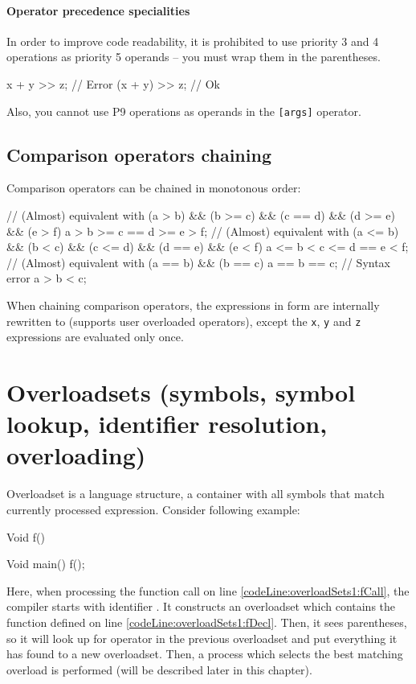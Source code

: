 \paragraph{Operator precedence specialities}
In order to improve code readability, it is prohibited to use priority 3 and 4 operations as priority 5 operands -- you must wrap them in the parentheses.
\begin{code}
x + y >> z; // Error
(x + y) >> z; // Ok
\end{code}

Also, you cannot use P9 operations as operands in the \verb|[args]| operator.

\subsection{Comparison operators chaining} Comparison operators can be chained in monotonous order:
\begin{code}
// (Almost) equivalent with (a > b) && (b >= c) && (c == d) && (d >= e) && (e > f)
a > b >= c == d >= e > f;
// (Almost) equivalent with (a <= b) && (b < c) && (c <= d) && (d == e) && (e < f)
a <= b < c <= d == e < f;
// (Almost) equivalent with (a == b) && (b == c)
a == b == c;
// Syntax error
a > b < c;
\end{code}

When chaining comparison operators, the expressions in form  are internally rewritten to  (supports user overloaded operators), except the \verb|x|, \verb|y| and \verb|z| expressions are evaluated only once.

\section{Overloadsets (symbols, symbol lookup, identifier resolution, overloading)}
Overloadset is a language structure, a container with all symbols that match currently processed expression. Consider following example:

\begin{code}
	Void f() {}$\label{codeLine:overloadSets1:fDecl}$
	
	Void main() {
		f();$\label{codeLine:overloadSets1:fCall}$	
	}
\end{code}

Here, when processing the function call on line \ref{codeLine:overloadSets1:fCall}, the compiler starts with identifier . It constructs an overloadset which contains the function  defined on line \ref{codeLine:overloadSets1:fDecl}. Then, it sees parentheses, so it will look up for operator  in the previous overloadset and put everything it has found to a new overloadset. Then, a process which selects the best matching overload is performed (will be described later in this chapter).


